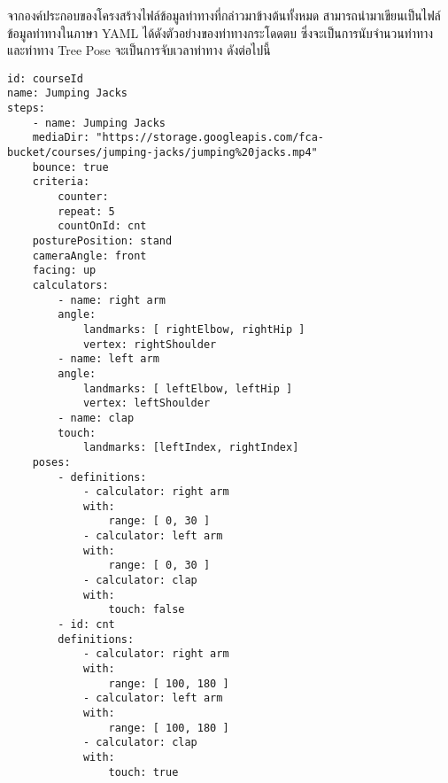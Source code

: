 จากองค์ประกอบของโครงสร้างไฟล์ข้อมูลท่าทางที่กล่าวมาข้างต้นทั้งหมด สามารถนำมาเขียนเป็นไฟล์ข้อมูลท่าทางในภาษา YAML ได้ดังตัวอย่างของท่าทางกระโดดตบ ซึ่งจะเป็นการนับจำนวนท่าทาง และท่าทาง Tree Pose จะเป็นการจับเวลาท่าทาง ดังต่อไปนี้
\begin{lstlisting}[caption=ตัวอย่างไฟล์ข้อมูลท่าทางของท่าทางกระโดดตบ (Jumping Jacks)]
id: courseId
name: Jumping Jacks
steps:
    - name: Jumping Jacks
    mediaDir: "https://storage.googleapis.com/fca-bucket/courses/jumping-jacks/jumping%20jacks.mp4"
    bounce: true
    criteria:
        counter:
        repeat: 5
        countOnId: cnt
    posturePosition: stand
    cameraAngle: front
    facing: up
    calculators:
        - name: right arm
        angle:
            landmarks: [ rightElbow, rightHip ]
            vertex: rightShoulder
        - name: left arm
        angle:
            landmarks: [ leftElbow, leftHip ]
            vertex: leftShoulder
        - name: clap
        touch:
            landmarks: [leftIndex, rightIndex]
    poses:
        - definitions:
            - calculator: right arm
            with:
                range: [ 0, 30 ]
            - calculator: left arm
            with:
                range: [ 0, 30 ]
            - calculator: clap
            with:
                touch: false
        - id: cnt
        definitions:
            - calculator: right arm
            with:
                range: [ 100, 180 ]
            - calculator: left arm
            with:
                range: [ 100, 180 ]
            - calculator: clap
            with:
                touch: true    
\end{lstlisting}
